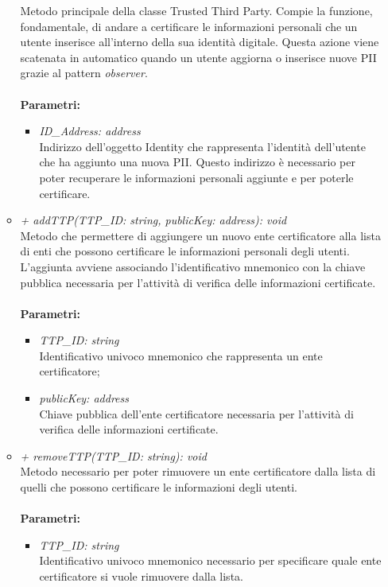 \begin{itemize}
\begin{itemize}
		Metodo principale della classe Trusted Third Party. Compie la funzione, fondamentale, di andare a certificare le informazioni personali che un utente inserisce all'interno della sua identità digitale. Questa azione viene scatenata in automatico quando un utente aggiorna o inserisce nuove \gls{PII} grazie al pattern \textit{observer}.\\\\
		\textbf{Parametri:}
		\begin{itemize}
			\item \textit{ID\_Address: address}\\
			Indirizzo dell'oggetto Identity che rappresenta l'identità dell'utente che ha aggiunto una nuova \gls{PII}. Questo indirizzo è necessario per poter recuperare le informazioni personali aggiunte e per poterle certificare.			
		\end{itemize}
		\item \textit{+ addTTP(TTP\_ID: string, publicKey: address): void}\\
		Metodo che permettere di aggiungere un nuovo ente certificatore alla lista di enti che possono certificare le informazioni personali degli utenti. L'aggiunta avviene associando l'identificativo mnemonico con la chiave pubblica necessaria per l'attività di verifica delle informazioni certificate.\\\\
		\textbf{Parametri:}
		\begin{itemize}
			\item \textit{TTP\_ID: string}\\
			Identificativo univoco mnemonico che rappresenta un ente certificatore;
			\item \textit{publicKey: address}\\
			Chiave pubblica dell'ente certificatore necessaria per l'attività di verifica delle informazioni certificate.
		\end{itemize}
		\item \textit{+ removeTTP(TTP\_ID: string): void}\\
		Metodo necessario per poter rimuovere un ente certificatore dalla lista di quelli che possono certificare le informazioni degli utenti.\\\\
		\textbf{Parametri:}
		\begin{itemize}
			\item \textit{TTP\_ID: string}\\
			Identificativo univoco mnemonico necessario per specificare quale ente certificatore si vuole rimuovere dalla lista.

\end{itemize}
\end{itemize}
\end{itemize}
